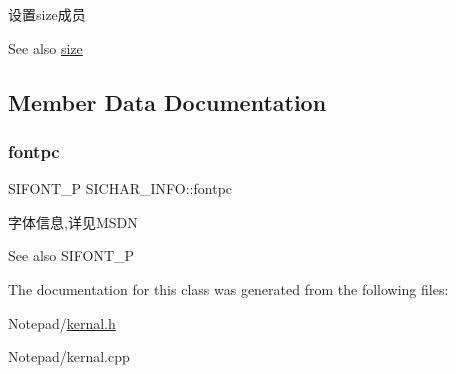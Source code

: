 设置size成员 

\begin{DoxySeeAlso}{See also}
\hyperlink{class_s_i_c_h_a_r___i_n_f_o_abcc72d98471148d54e334f9528103a50}{size} 
\end{DoxySeeAlso}


\subsection{Member Data Documentation}
\mbox{\label{class_s_i_c_h_a_r___i_n_f_o_a8d998c494943882d98981f79f620460d}} 
\subsubsection{\texorpdfstring{fontpc}{fontpc}}
{\footnotesize\ttfamily S\+I\+F\+O\+N\+T\+\_\+P S\+I\+C\+H\+A\+R\+\_\+\+I\+N\+F\+O\+::fontpc}



字体信息,详见\+M\+S\+DN 

\begin{DoxySeeAlso}{See also}
S\+I\+F\+O\+N\+T\+\_\+P 
\end{DoxySeeAlso}


The documentation for this class was generated from the following files\+:\begin{DoxyCompactItemize}
\item 
Notepad/\hyperlink{kernal_8h}{kernal.\+h}\item 
Notepad/kernal.\+cpp\end{DoxyCompactItemize}
